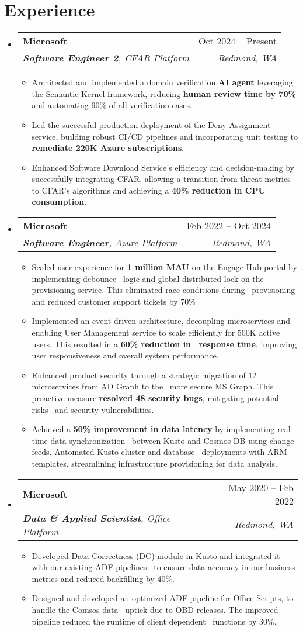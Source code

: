 \documentclass[letterpaper,12pt]{article}
\makeatletter
\newcommand{\resumeItem}[1]{
  \item\small{
    {#1 \vspace{-2pt}}
  }
}
\newcommand{\resumeSubheading}[4]{
  \vspace{-2pt}\item
    \begin{tabular*}{0.97\textwidth}[t]{l@{\extracolsep{\fill}}r}
      \textbf{#1} & #2 \\
      \textit{\small#3} & \textit{\small #4} \\
    \end{tabular*}\vspace{-7pt}
}
\newcommand{\resumeSubHeadingListStart}{\begin{itemize}[leftmargin=0.15in, label={}]}
\newcommand{\resumeSubHeadingListEnd}{\end{itemize}}
\newcommand{\resumeItemListStart}{\begin{itemize}}
\newcommand{\resumeItemListEnd}{\end{itemize}\vspace{-5pt}}
\makeatother
\begin{document}
\section{Experience}
\resumeSubHeadingListStart

    \resumeSubheading
    {Microsoft}{Oct 2024 -- Present}
    {\textbf{Software Engineer 2}, CFAR Platform}{Redmond, WA}
    \resumeItemListStart
        \resumeItem{Architected and implemented a domain verification \textbf{AI agent} leveraging the Semantic Kernel framework, reducing \textbf{human review time by 70\%} and automating 90\% of all verification cases.}
        \resumeItem{Led the successful production deployment of the Deny Assignment service, building robust CI/CD pipelines and incorporating unit testing to \textbf{remediate 220K Azure subscriptions}.}
        \resumeItem{Enhanced Software Download Service's efficiency and decision-making by successfully integrating CFAR, allowing a transition from threat metrics to CFAR's algorithms and achieving a \textbf{40\% reduction in CPU consumption}.}
    \resumeItemListEnd
    \vspace{0.5cm}
    \resumeSubheading
    {Microsoft}{Feb 2022 -- Oct 2024}
    {\textbf{Software Engineer}, Azure Platform}{Redmond, WA}
    \resumeItemListStart
        \resumeItem{Scaled user experience for \textbf{1 million MAU} on the Engage Hub portal by implementing debounce  logic and global distributed lock on the provisioning service. This eliminated race conditions during  provisioning and reduced customer support tickets by 70\%}
        \resumeItem{Implemented an event-driven architecture, decoupling microservices and enabling User Management service to scale efficiently for 500K active users. This resulted in a \textbf{60\% reduction in  response time}, improving user responsiveness and overall system performance. }
        \resumeItem{Enhanced product security through a strategic migration of 12 microservices from AD Graph to the  more secure MS Graph. This proactive measure \textbf{resolved 48 security bugs}, mitigating potential risks  and security vulnerabilities. }
        \resumeItem{Achieved a \textbf{50\% improvement in data latency} by implementing real-time data synchronization  between Kusto and Cosmos DB using change feeds. Automated Kusto cluster and database  deployments with ARM templates, streamlining infrastructure provisioning for data analysis. }
    \resumeItemListEnd
    \vspace{0.5cm}
      \resumeSubheading
    {Microsoft}{May 2020 -- Feb 2022}
    {\textbf{Data \& Applied Scientist}, Office Platform}{Redmond, WA}
    \resumeItemListStart
        \resumeItem{Developed Data Correctness (DC) module in Kusto and integrated it with our existing ADF pipelines  to ensure data accuracy in our business metrics and reduced backfilling by 40\%.
}
        \resumeItem{Designed and developed an optimized ADF pipeline for Office Scripts, to handle the Comsos data  uptick due to OBD releases. The improved pipeline reduced the runtime of client dependent  functions by 30\%.  }
    \resumeItemListEnd
\resumeSubHeadingListEnd
\end{document}
